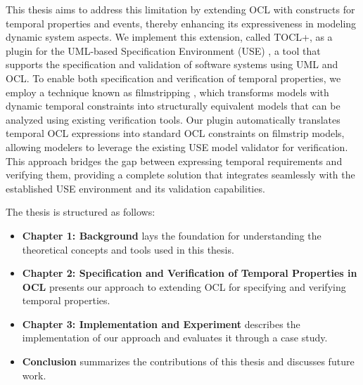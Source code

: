 This thesis aims to address this limitation by extending OCL with constructs for
temporal properties and events, thereby enhancing its expressiveness in modeling dynamic 
system aspects. We implement this extension, called TOCL+, as a plugin for the 
UML-based Specification Environment (USE) \cite{USE}, a tool that supports the 
specification and validation of software systems using UML and OCL. To enable both
specification and verification of temporal properties, we employ a 
technique known as filmstripping \cite{Filmstripping}, which transforms models 
with dynamic temporal constraints into structurally equivalent models that can 
be analyzed using existing verification tools. Our plugin automatically translates 
temporal OCL expressions into standard OCL constraints on filmstrip models, 
allowing modelers to leverage the existing USE model validator \cite{USE_Validator} 
for verification. This approach bridges the gap between expressing temporal 
requirements and verifying them, providing a complete solution that integrates 
seamlessly with the established USE environment and its validation capabilities.

The thesis is structured as follows:
\begin{itemize}
  \item \textbf{Chapter 1: Background} lays the foundation for understanding the theoretical concepts and tools used in this thesis.
  
  \item \textbf{Chapter 2: Specification and Verification of Temporal Properties in OCL} presents our approach to extending OCL for specifying and verifying temporal properties.

  \item \textbf{Chapter 3: Implementation and Experiment} describes the implementation of our approach and evaluates it through a case study.

  \item \textbf{Conclusion} summarizes the contributions of this thesis and discusses future work.
\end{itemize}